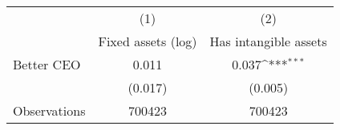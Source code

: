 {
\def\sym#1{\ifmmode^{#1}\else\(^{#1}\)\fi}
\begin{tabular}{l*{2}{c}}
\hline\hline
                    &\multicolumn{1}{c}{(1)}&\multicolumn{1}{c}{(2)}\\
                    &\multicolumn{1}{c}{Fixed assets (log)}&\multicolumn{1}{c}{Has intangible assets}\\
\hline
Better CEO          &       0.011         &       0.037\sym{***}\\
                    &     (0.017)         &     (0.005)         \\
\hline
Observations        &      700423         &      700423         \\
\hline\hline
\end{tabular}
}
